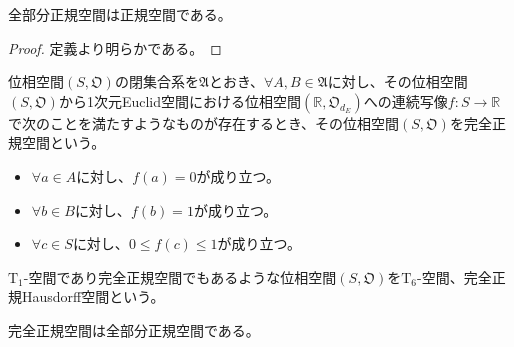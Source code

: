 \documentclass[dvipdfmx]{jsarticle}
\begin{document}
\begin{thm}\label{8.1.7.29} 全部分正規空間は正規空間である。
\end{thm}
\begin{proof} 定義より明らかである。
\end{proof}
\begin{dfn}
位相空間$\left( S,\mathfrak{O} \right)$の閉集合系を$\mathfrak{A}$とおき、$\forall A,B \in \mathfrak{A}$に対し、その位相空間$\left( S,\mathfrak{O} \right)$から1次元Euclid空間における位相空間$\left( \mathbb{R},\mathfrak{O}_{d_{E}} \right)$への連続写像$f:S \rightarrow \mathbb{R}$で次のことを満たすようなものが存在するとき、その位相空間$\left( S,\mathfrak{O} \right)$を完全正規空間という。
\begin{itemize}
\item
  $\forall a \in A$に対し、$f(a) = 0$が成り立つ。
\item
  $\forall b \in B$に対し、$f(b) = 1$が成り立つ。
\item
  $\forall c \in S$に対し、$0 \leq f(c) \leq 1$が成り立つ。
\end{itemize}
\end{dfn}
\begin{dfn}
$\mathrm{T}_{1}$-空間であり完全正規空間でもあるような位相空間$\left( S,\mathfrak{O} \right)$を$\mathrm{T}_{6}$-空間、完全正規Hausdorff空間という。
\end{dfn}
\begin{thm}\label{8.1.7.30} 完全正規空間は全部分正規空間である。
\end{thm}
\end{document}
